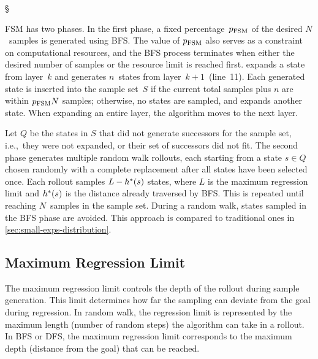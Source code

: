 \begin{algorithm}[tb]
{        

        \Return \S \\
    }
\end{algorithm}

FSM has two phases. In the first phase, a fixed percentage~$p_\text{FSM}$ of the desired $N$~samples is generated using BFS. The value of $p_\text{FSM}$ also serves as a constraint on computational resources, and the BFS process terminates when either the desired number of samples or the resource limit is reached first. \bfs expands a state from layer~$k$ and generates $n$~states from layer~$k+1$~(line~11). Each generated state is inserted into the sample set~$S$ if the current total samples plus $n$ are within $p_{\text{FSM}}N$ samples; otherwise, no states are sampled, and \bfs expands another state. When expanding an entire layer, the algorithm moves to the next layer.

Let $Q$ be the states in $S$ that did not generate successors for the sample set, i.e.,~they were not expanded, or their set of successors did not fit. The second phase generates multiple random walk rollouts, each starting from a state $s \in Q$ chosen randomly with a complete replacement after all states have been selected once. Each rollout samples $L-h^{*}(s)$ states, where $L$ is the maximum regression limit and $h^{*}(s)$ is the distance already traversed by BFS. This is repeated until reaching $N$~samples in the sample set. During a random walk, states sampled in the BFS phase are avoided. This approach is compared to traditional ones in \cref{sec:small-exps-distribution}.

\subsection{Maximum Regression Limit}
\label{sec:rollout-limit}

The maximum regression limit controls the depth of the rollout during sample generation. This limit determines how far the sampling can deviate from the goal during regression. In random walk, the regression limit is represented by the maximum length (number of random steps) the algorithm can take in a rollout. In BFS or DFS, the maximum regression limit corresponds to the maximum depth (distance from the goal) that can be reached.

